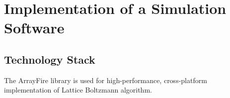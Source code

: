%
%
%
%
%
%
%


\section{Implementation of a Simulation Software} \label{sec:implementation}

\subsection{Technology Stack} \label{sec:tech-stack}


The ArrayFire library is used for high-performance, cross-platform implementation of Lattice Boltzmann algorithm.

